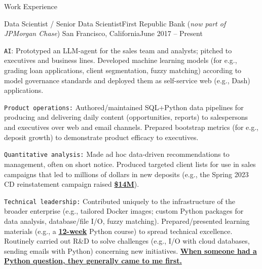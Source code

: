 \documentclass{article}
\newlength{\tabin}
\newlength{\secsep}
\newcommand{\lineunder}{\vspace*{-8pt} \\ \hspace*{-6pt} \hrulefill \\ \vspace*{-15pt}}
\newenvironment{tabbedsection}[1]{
  \begin{list}{}{
      \setlength{\itemsep}{0pt}
      \setlength{\labelsep}{0pt}
      \setlength{\labelwidth}{0pt}
      \setlength{\leftmargin}{\tabin}
      \setlength{\rightmargin}{\tabin}
      \setlength{\listparindent}{0pt}
      \setlength{\parsep}{0pt}
      \setlength{\parskip}{0pt}
      \setlength{\partopsep}{0pt}
      \setlength{\topsep}{#1}
    }
  \item[]
}{\end{list}}
\newenvironment{resume_section}[1]{
  \filbreak
  \vspace{2\secsep}
  \textsc{\large#1}
  \lineunder
  \begin{tabbedsection}{\secsep}
}{\end{tabbedsection}}
\newenvironment{subitems}{
  \renewcommand{\labelitemi}{-}
  \begin{itemize}
      \setlength{\labelsep}{1em}
}{\end{itemize}}
\newenvironment{resume_employer}[4]{
  \vspace{\secsep}
  \textbf{#1} \\ 
  \indent {\small #2} \hfill {\footnotesize#3 (#4)}
  \begin{tabbedsection}{0pt}
  \begin{subitems}
}{\end{subitems}\end{tabbedsection}}
\begin{document}
\begin{resume_section}{Work Experience}

  \begin{resume_employer}{Data Scientist / Senior Data Scientist}{First Republic Bank (\textit{now part of JPMorgan Chase})}
  {San Francisco, California}{June 2017 -- Present}

    \item \texttt{AI}: Prototyped an LLM-agent for the sales team and analysts; pitched to executives and business lines. Developed machine learning models (for e.g., grading loan applications, client segmentation, fuzzy matching) according to model governance standards and deployed them as self-service web (e.g., Dash) applications.
    \item \texttt{Product operations:} Authored/maintained SQL+Python data pipelines for producing and delivering daily content (opportunities, reports) to salespersons and executives over web and email channels. Prepared bootstrap metrics (for e.g., deposit growth) to demonstrate product efficacy to executives.
    \item \texttt{Quantitative analysis:} Made ad hoc data-driven recommendations to management, often on short notice. Produced targeted client lists for use in sales campaigns that led to millions of dollars in new deposits (e.g., the Spring 2023 CD reinstatement campaign raised \underline{\textbf{\$14M}}).
    \item \texttt{Technical leadership:} Contributed uniquely to the infrastructure of the broader enterprise (e.g., tailored Docker images; custom Python packages for data analysis, database/file I/O, fuzzy matching). Prepared/presented learning materials (e.g., a \underline{\textbf{12-week}} Python course) to spread technical excellence. Routinely carried out R\&D to solve challenges (e.g., I/O with cloud databases, sending emails with Python) concerning new initiatives. \underline{\textbf{When someone had a Python question, they generally came to me first.}}
  \end{resume_employer}


\end{resume_section}
\end{document}
